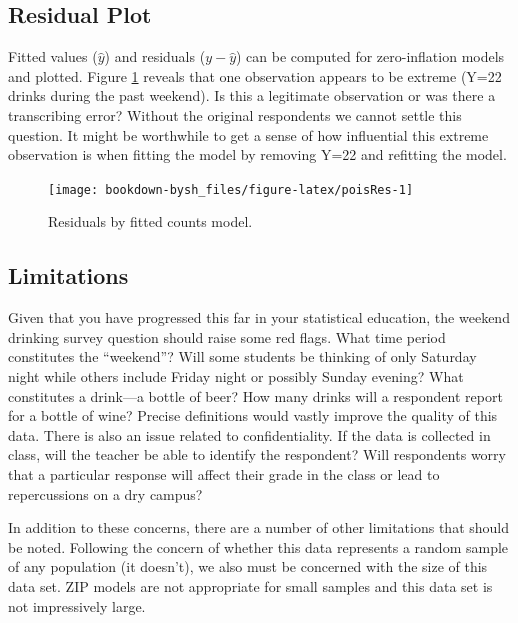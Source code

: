 \documentclass[
]{krantz}
\begin{document}
\hypertarget{residual-plot}{%
\subsection{Residual Plot}\label{residual-plot}}

Fitted values (\(\hat{y}\)) and residuals (\(y-\hat{y}\)) can be computed for zero-inflation models and plotted. Figure \ref{fig:poisRes} reveals that one observation appears to be extreme (Y=22 drinks during the past weekend). Is this a legitimate observation or was there a transcribing error? Without the original respondents we cannot settle this question. It might be worthwhile to get a sense of how influential this extreme observation is when fitting the model by removing Y=22 and refitting the model.

\begin{figure}

{\centering \texttt{[image: bookdown-bysh\_files/figure-latex/poisRes-1]} 

}

\caption{Residuals by fitted counts model.}\label{fig:poisRes}
\end{figure}

\hypertarget{limitations}{%
\subsection{Limitations}\label{limitations}}

Given that you have progressed this far in your statistical education, the weekend drinking survey question should raise some red flags. What time period constitutes the ``weekend''? Will some students be thinking of only Saturday night while others include Friday night or possibly Sunday evening? What constitutes a drink---a bottle of beer? How many drinks will a respondent report for a bottle of wine? Precise definitions would vastly improve the quality of this data. There is also an issue related to confidentiality. If the data is collected in class, will the teacher be able to identify the respondent? Will respondents worry that a particular response will affect their grade in the class or lead to repercussions on a dry campus?

In addition to these concerns, there are a number of other limitations that should be noted. Following the concern of whether this data represents a random sample of any population (it doesn't), we also must be concerned with the size of this data set. ZIP models are not appropriate for small samples and this data set is not impressively large.
\end{document}
